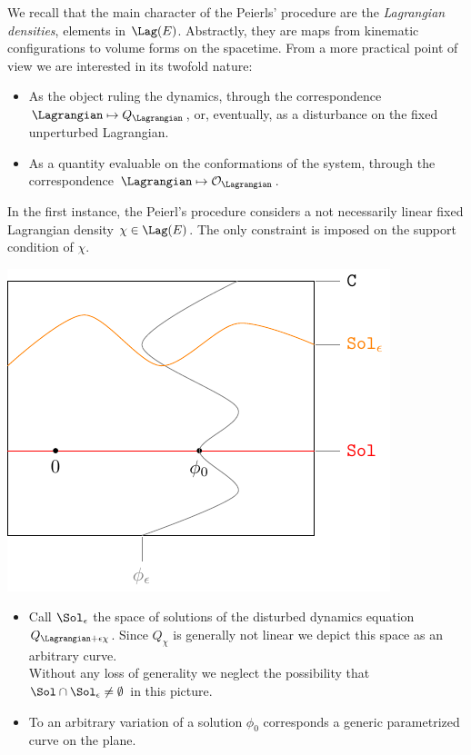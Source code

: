 \documentclass[Main]{subfiles}
\begin{document}
		We recall that the main character of the Peierls' procedure are the \emph{Lagrangian densities}, elements in $\Lag(E)$.
		Abstractly, they are maps from kinematic configurations to volume forms on the spacetime. From a more practical point of view we are interested in its twofold nature:
		\begin{itemize}
			\item As the object ruling the dynamics, through the correspondence $\Lagrangian \mapsto Q_\Lagrangian$, or, eventually, as a disturbance on the fixed unperturbed Lagrangian.
			\item As a quantity evaluable on the conformations of the system, through the correspondence  $\Lagrangian \mapsto  \mathcal{O}_\Lagrangian$.
		\end{itemize}
		
		In the first instance, the Peierl's procedure considers a not necessarily linear fixed Lagrangian density $\chi\in \Lag(E)$. The only constraint is imposed on the support condition of $\chi$.\\
		\vspace{1mm}		
		\begin{minipage}{0.5\textwidth}
			\includegraphics[width=\textwidth]{Pictures/GeometricPicture1}
		\end{minipage}
		\begin{minipage}{0.5\textwidth}
			\begin{itemize}
				\item Call $\Sol_\epsilon$ the space of solutions of the disturbed dynamics equation $Q_{\Lagrangian + \epsilon \chi}$.
					Since $Q_\chi$ is generally not linear we depict this space as an arbitrary curve.\\
					Without any loss of generality we  neglect the possibility that $\Sol \cap \Sol_\epsilon \neq \emptyset$ in this picture.
				\item To an arbitrary variation of a solution $\phi_0$ corresponds a generic parametrized curve on the plane.
			\end{itemize}
		\end{minipage}
\end{document}
